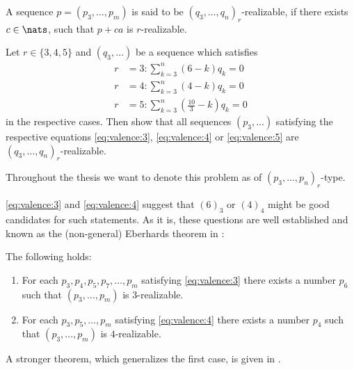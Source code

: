 \begin{definition}\label{def:eberhard:realizable}
  A sequence $p = (p_3, \dots, p_m)$ is said to be $(q_3, \dots, q_n)_r$-realizable, if there exists $c \in \nats$, such that $p + c a$ is $r$-realizable.
\end{definition}
\begin{problem}
  Let $r \in \{3, 4, 5\}$ and $(q_3, \dots)$ be a sequence which satisfies 
  \begin{align}
    r &= 3: \sum_{k=3}^n \left( 6            - k \right) q_k = 0 \label{eq:zero:curv:3}\\
    r &= 4: \sum_{k=3}^n \left( 4            - k \right) q_k = 0 \label{eq:zero:curv:4}\\
    r &= 5: \sum_{k=3}^n \left( \frac{10}{3} - k \right) q_k = 0 \label{eq:zero:curv:5}
  \end{align}
  in the respective cases. Then show that all sequences $(p_3, \dots)$ satisfying the respective equations \ref{eq:valence:3}, \ref{eq:valence:4} or \ref{eq:valence:5} are $(q_3, \dots, q_n)_r$-realizable.
\end{problem}
\begin{notation}
  Throughout the thesis we want to denote this problem as of $(p_3, \dots, p_n)_r$-type.
\end{notation}

\autoref{eq:valence:3} and \autoref{eq:valence:4} suggest that $(6)_3$ or $(4)_4$ might be good candidates for such statements. As it is, these questions are well established and known as the (non-general) Eberhards theorem in \cite{ConvexPolytopes}:
\renewcommand{\Itemautorefname}{Theorem \ref{thm:eberhard}}
\begin{theorem} \label{thm:eberhard} The following holds:
  \begin{enumerate}[label=(\roman*)]
  \item \label{thm:eberhard:3} For each $p_3, p_4, p_5, p_7, \dots, p_m$ satisfying \autoref{eq:valence:3} there exists a number $p_6$ such that $(p_3, \dots, p_m)$ is $3$-realizable. 
  \item \label{thm:eberhard:4} For each $p_3, p_5, \dots, p_m$ satisfying \autoref{eq:valence:4} there exists a number $p_4$ such that $(p_3, \dots, p_m)$ is $4$-realizable. 
  \end{enumerate}
\end{theorem}

A stronger theorem, which generalizes the first case, is given in \cite{jendrol1977generalization}.

